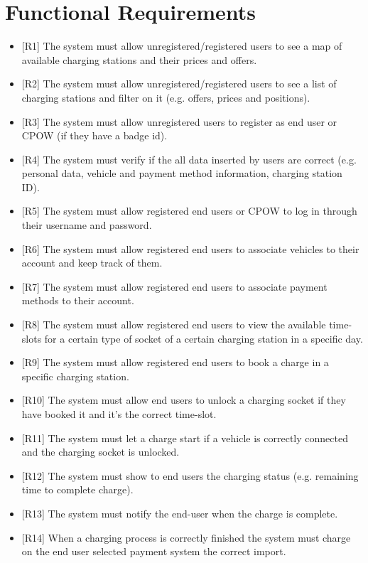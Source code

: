\documentclass[a4paper]{report}
\begin{document}
\section{Functional Requirements}
\begin{itemize}
    \item{[R1]} \label{R1} The system must allow unregistered/registered users to see a map of available charging stations and their prices and offers.
    \item{[R2]} \label{R2} The system must allow unregistered/registered users to see a list of charging stations and filter on it (e.g. offers, prices and positions).
    \item{[R3]} \label{R3} The system must allow unregistered users to register as end user or CPOW (if they have a badge id).
    \item{[R4]} \label{R4} The system must verify if the all data inserted by users are correct (e.g. personal data, vehicle and payment method information, charging station ID).
    \item{[R5]} \label{R5} The system must allow registered end users or CPOW to log in through their username and password.
    \item{[R6]} \label{R6} The system must allow registered end users to associate vehicles to their account and keep track of them.
    \item{[R7]} \label{R7} The system must allow registered end users to associate payment methods to their account.
    \item{[R8]} \label{R8} The system must allow registered end users to view the available time-slots for a certain type of socket of a certain charging station in a specific day.
    \item{[R9]} \label{R9} The system must allow registered end users to book a charge in a specific charging station.
    \item{[R10]} \label{R10} The system must allow end users to unlock a charging socket if they have booked it and it's the correct time-slot.
    \item{[R11]} \label{R11} The system must let a charge start if a vehicle is correctly connected and the charging socket is unlocked.
    \item{[R12]} \label{R12} The system must show to end users the charging status (e.g. remaining time to complete charge).
    \item{[R13]} \label{R13} The system must notify the end-user when the charge is complete.
    \item{[R14]} \label{R14} When a charging process is correctly finished the system must charge on the end user selected payment system the correct import.

\end{itemize}
\end{document}
